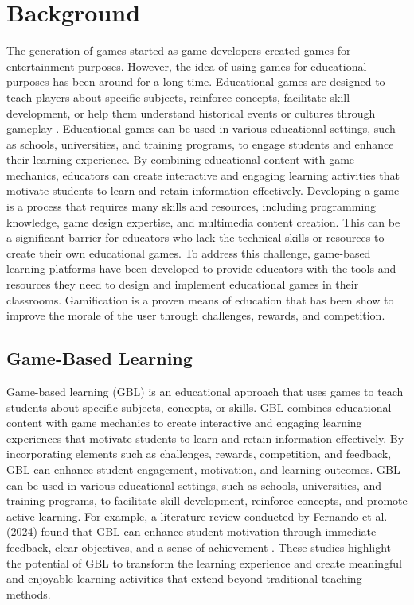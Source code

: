 \chapter{Background}\label{chap:background}
The generation of games started as game developers created games for entertainment purposes. However, the idea of using games for educational purposes has been around for a long time. Educational games are designed to teach players about specific subjects, reinforce concepts, facilitate skill development, or help them understand historical events or cultures through gameplay \cite{crawford1982art}. Educational games can be used in various educational settings, such as schools, universities, and training programs, to engage students and enhance their learning experience. By combining educational content with game mechanics, educators can create interactive and engaging learning activities that motivate students to learn and retain information effectively. Developing a game is a process that requires many skills and resources, including programming knowledge, game design expertise, and multimedia content creation. This can be a significant barrier for educators who lack the technical skills or resources to create their own educational games. To address this challenge, game-based learning platforms have been developed to provide educators with the tools and resources they need to design and implement educational games in their classrooms. Gamification is a proven means of education that has been show to improve the morale of the user through challenges, rewards, and competition. 

\section{Game-Based Learning}
Game-based learning (GBL) is an educational approach that uses games to teach students about specific subjects, concepts, or skills. GBL combines educational content with game mechanics to create interactive and engaging learning experiences that motivate students to learn and retain information effectively. By incorporating elements such as challenges, rewards, competition, and feedback, GBL can enhance student engagement, motivation, and learning outcomes. GBL can be used in various educational settings, such as schools, universities, and training programs, to facilitate skill development, reinforce concepts, and promote active learning. For example, a literature review conducted by Fernando et al. (2024) found that GBL can enhance student motivation through immediate feedback, clear objectives, and a sense of achievement \cite{fernando2024}. These studies highlight the potential of GBL to transform the learning experience and create meaningful and enjoyable learning activities that extend beyond traditional teaching methods.

